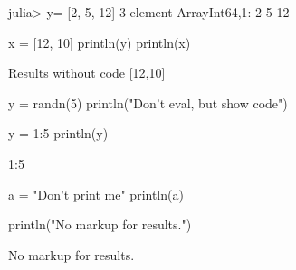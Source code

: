 

\begin{juliaterm}
julia> y= [2, 5, 12]
3-element Array{Int64,1}:
  2
  5
 12

\end{juliaterm}



\begin{juliacode}
x = [12, 10]
println(y)
println(x)
\end{juliacode}
\begin{juliaout}
[2,5,12]
[12,10]
\end{juliaout}




\begin{juliaout}
Results without code
[12,10]
\end{juliaout}




\begin{juliacode}
y = randn(5)
println("Don't eval, but show code")
\end{juliacode}



\begin{juliacode}
y = 1:5
println(y)
\end{juliacode}
\begin{juliaout}
1:5
\end{juliaout}



\begin{juliacode}
a = "Don't print me"
println(a)
\end{juliacode}



\begin{juliacode}
println("No markup for results.")
\end{juliacode}

No markup for results.
